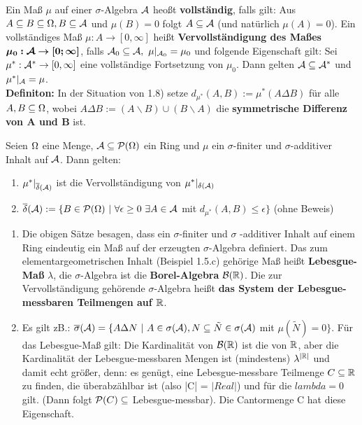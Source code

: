 \documentclass[parskip = full, 12pt]{scrartcl}
\begin{document}
\label{ss: Definition 1.10}
	Ein Maß $\mu$ auf einer $\sigma$-Algebra $\mathcal{A}$ heoßt \textbf{vollständig}, 
	falls gilt: Aus $A \subseteq B  \subseteq \Omega, B \subseteq \mathcal{A}$ und 
	$\mu(B) = 0$ folgt $A \subseteq \mathcal{A}$ (und natürlich $\mu(A) = 0$). Ein 
	vollständiges Maß $\mu: A	\rightarrow [0, \infty]$ heißt \textbf{
	Vervollständigung des Maßes} $\bm{\mu_0: \mathcal{A} \rightarrow [0;\infty]}$, falls 
	$\mathcal{A}_0 \subseteq \mathcal{A},\ \mu|_{\mathcal{A}_0} = \mu_0$ und folgende Eigenschaft gilt: 
	Sei $\mu^*:\mathcal{A}^* \rightarrow [0, \infty]$ eine vollständige Fortsetzung 
	von $\mu_0$. Dann gelten $\mathcal{A} \subseteq \mathcal{A}^*$ und $\mu^*|_{\mathcal{A}} = \mu$.\\
	\textbf{Definiton:} In der Situation von 1.8) setze $d_{\mu^*}(A,B) := \mu^*
	(A \Delta B)$ für alle $A, B \subseteq \Omega$, wobei $A\Delta B := (A \backslash 
	B) \cup (B \backslash A)$ die \textbf{symmetrische Differenz von A und B} ist.

\label{ss: Satz 1.11}   
	Seien $\Omega$ eine Menge, $\mathcal{A} \subseteq \mathcal{P}(\Omega)$ ein Ring und $\mu$ ein 
	$\sigma$-finiter und $\sigma$-additiver Inhalt auf $\mathcal{A}$. Dann gelten:
	\begin{enumerate}
		\item $\mu^*|_{\overline{\delta}(\mathcal{A})}$ ist die Vervollständigung von 
			$\mu^*|_{\delta(\mathcal{A})}$
		\item $ \overline{\delta}(\mathcal{A}) := \{ B \in \mathcal{P}(\Omega)\ |\ \forall \epsilon 
			\geq 0\ \exists A \in \mathcal{A} $ mit $d_{\mu^*}(A,B) \leq \epsilon \}$ 
			(ohne Beweis)
	\end{enumerate}			

\label{ss: Bemerkung 1.12}
	\begin{enumerate}
		\item Die obigen Sätze besagen, dass ein $\sigma$-finiter und {$\sigma$
			-additiver} Inhalt auf einem Ring eindeutig ein Maß auf der erzeugten 
			$\sigma$-Algebra definiert. Das zum elementargeometrischen Inhalt 
			(Beispiel 1.5.c) gehörige Maß heißt \textbf{Lebesgue-Maß} $\lambda$, die 
			$\sigma$-Algebra ist die \textbf{Borel-Algebra} $\mathcal{B}(\mathbb{R})$. Die zur 
			Vervollständigung gehörende $\sigma$-Algebra heißt \textbf{das System der
			Lebesgue-messbaren Teilmengen auf $\mathbb{R}$}.
		\item Es gilt zB.: $\overline{\sigma}(\mathcal{A}) = \{ A \Delta N\ |\ A \in \sigma
			(\mathcal{A}), N \subseteq \tilde{N} \in \sigma(\mathcal{A})$ mit $\mu(\tilde{N}) = 0 \}$.
			Für das Lebesgue-Maß gilt: Die Kardinalität von $\mathcal{B}(\mathbb{R})$ ist die von
			$\mathbb{R}$, aber die Kardinalität der Lebesgue-messbaren Mengen ist 
			(mindestens) $\lambda^{|\mathbb{R}|}$ und damit echt größer, denn: es genügt,
			eine Lebesgue-messbare Teilmenge $C \subseteq \mathbb{R}$ zu finden, die 
			überabzählbar ist (also |C| = $|Real|$) und für die $lambda = 0$ gilt. 
			(Dann folgt $\mathcal{P}(C) \subseteq$ Lebesgue-messbar). Die Cantormenge C hat 
			diese Eigenschaft.
	\end{enumerate}
\end{document}
